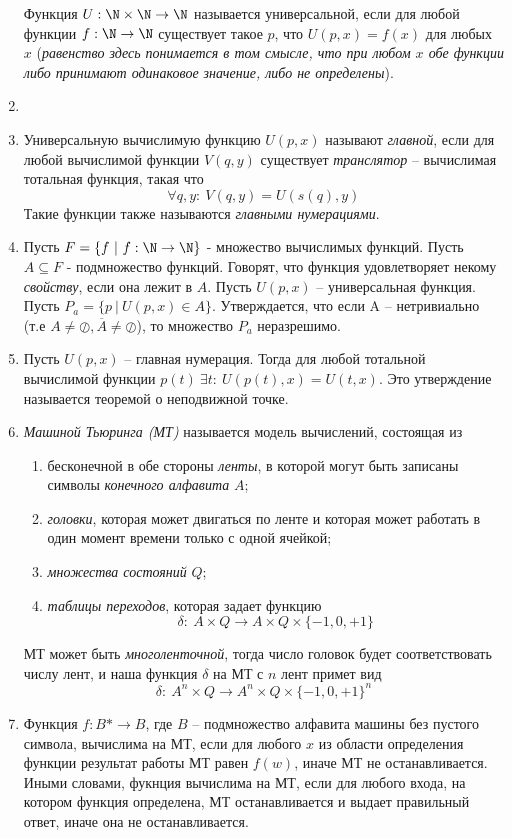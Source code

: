 \documentclass[a4paper,12pt]{article}
\begin{document}
\begin{enumerate}
    Функция $U:\N\times\N\to\N$ называется универсальной, если для любой функции $f: \N\to\N$ существует такое $p$, что $U(p, x)=f(x)$ для любых $x$ (\textit{равенство здесь понимается в том смысле, что при любом $x$ обе функции либо принимают одинаковое значение, либо не определены}).
    \item
	\item 
	Универсальную вычислимую функцию $U(p, x)$ называют \textit{главной}, если для любой вычислимой функции $V(q, y)$ существует \textit{транслятор} -- вычислимая тотальная функция, такая что 
	\[
	\forall q, y: \ V(q, y) = U(s(q), y)
	\]
	Такие функции также называются \textit{главными нумерациями}.
	\item 
	Пусть $F = \{ f \ | \ f : \N \rightarrow \N \}$ - множество вычислимых функций. Пусть $A \subseteq F$ - подмножество функций. Говорят, что функция удовлетворяет некому \textit{свойству}, если она лежит в $A$. Пусть $U(p, x)$ -- универсальная функция. Пусть $P_a = \{ p \ | \ U(p, x) \in A \}$. Утверждается, что если A -- нетривиально (т.е $A \neq \oslash, \overline{A} \neq \oslash$), то множество $P_a$ неразрешимо.
   	\item 
    Пусть $U(p, x)$ -- главная нумерация. Тогда для любой тотальной вычислимой функции $p(t) \  \exists t: \ U(p(t), x) = U(t, x)$. Это утверждение называется теоремой о неподвижной точке.
   \item
   \textit{Машиной Тьюринга (МТ)} называется модель вычислений, состоящая из
   \begin{enumerate}
       \item бесконечной в обе стороны \textit{ленты}, в которой могут быть записаны символы \textit{конечного алфавита} $A$;
       \item \textit{головки}, которая может двигаться по ленте и которая может работать в один момент времени только с одной ячейкой;
       \item \textit{множества состояний} $Q$;
       \item \textit{таблицы переходов}, которая задает функцию 
       \[
       \delta: \ A \times Q \rightarrow A \times Q \times \{-1, 0, +1\}
       \]
   \end{enumerate}
   МТ может быть \textit{многоленточной}, тогда число головок будет соответствовать числу лент, и наша функция $\delta$ на МТ с $n$ лент примет вид
   \[
   \delta: \ A^n \times Q \rightarrow A^n \times Q \times \{-1, 0, +1\}^n
   \]
   
   \item Функция $f: B* \rightarrow B$, где $B$ -- подмножество алфавита машины без пустого символа, вычислима на МТ, если для любого $x$ из области определения функции результат работы МТ равен $f(w)$, иначе МТ не останавливается. Иными словами, фукнция вычислима на МТ, если для любого входа, на котором функция определена, МТ останавливается и выдает правильный ответ, иначе она не останавливается.	
\end{enumerate}
		
	
\end{document}
